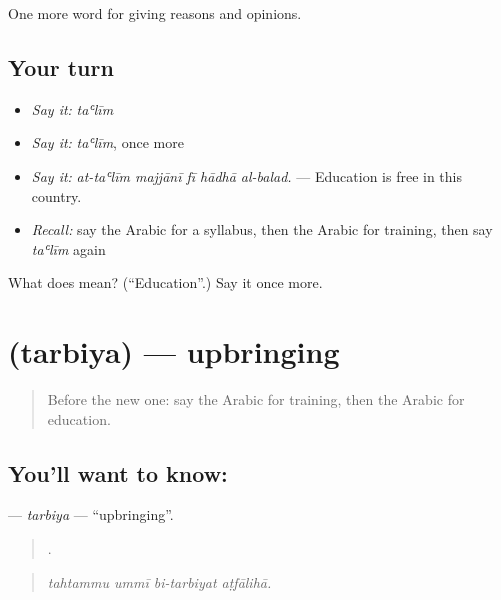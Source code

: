 \begin{grammarlens}[title={What you've built}]
One more word for giving reasons and opinions.
\end{grammarlens}

\subsection*{Your turn}
\begin{itemize}
\raggedright
  \item \emph{Say it:} \emph{taʿlīm}
  \item \emph{Say it:} \emph{taʿlīm}, once more
  \item \emph{Say it:} \emph{at-taʿlīm majjānī fī hādhā al-balad.} — Education is free in this country.
  \item \emph{Recall:} say the Arabic for a syllabus, then the Arabic for training, then say \emph{taʿlīm} again
\end{itemize}

\begin{tcolorbox}[breakable,colback=teal!4,colframe=teal!35!black,title={Before you move on}]
What does  mean? (\textquotedblleft{}Education\textquotedblright{}.) Say it once more.
\end{tcolorbox}
\section[\texorpdfstring{\ar{تربية} (tarbiya)}{تربية (tarbiya)}]{ (tarbiya) — upbringing}

\label{lesson:AR-C398-tarbiya}



\begin{quote}
Before the new one: say the Arabic for training, then the Arabic for education.
\end{quote}

\subsection*{You'll want to know: }
\textbf{} — \emph{tarbiya} — \textquotedblleft{}upbringing\textquotedblright{}.

\begin{quote}
   .
\end{quote}

\begin{quote}
\emph{tahtammu ummī bi-tarbiyat aṭfālihā.}
\end{quote}

